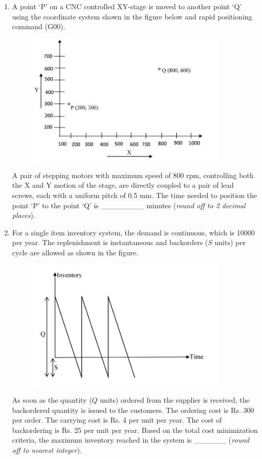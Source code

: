 \documentclass[12pt,onecolumn]{article}
\begin{document}
\begin{enumerate}
    \item A point `P' on a CNC controlled XY-stage is moved to another point `Q' using the coordinate system shown in the figure below and rapid positioning command (G00).
          \begin{figure}[H]
              \centering
              \includegraphics[width=0.9\textwidth]{q46s2}
              \label{fig:q46s2}
          \end{figure}
          A pair of stepping motors with maximum speed of 800 rpm, controlling both the X and Y motion of the stage, are directly coupled to a pair of lead screws, each with a uniform pitch of 0.5 mm. The time needed to position the point `P' to the point `Q' is \_\_\_\_\_\_\_\_ minutes (\textit{round off to 2 decimal places}).

    \item For a single item inventory system, the demand is continuous, which is 10000 per year. The replenishment is instantaneous and backorders ($S$ units) per cycle are allowed as shown in the figure.
          \begin{figure}[H]
              \centering
              \includegraphics[width=0.9\textwidth]{q47s2}
              \label{fig:q47s2}
          \end{figure}
          As soon as the quantity ($Q$ units) ordered from the supplier is received, the backordered quantity is issued to the customers. The ordering cost is Rs. 300 per order. The carrying cost is Rs. 4 per unit per year. The cost of backordering is Rs. 25 per unit per year. Based on the total cost minimization criteria, the maximum inventory reached in the system is \_\_\_\_\_\_ (\textit{round off to nearest integer}).


\end{enumerate}
\end{document}
